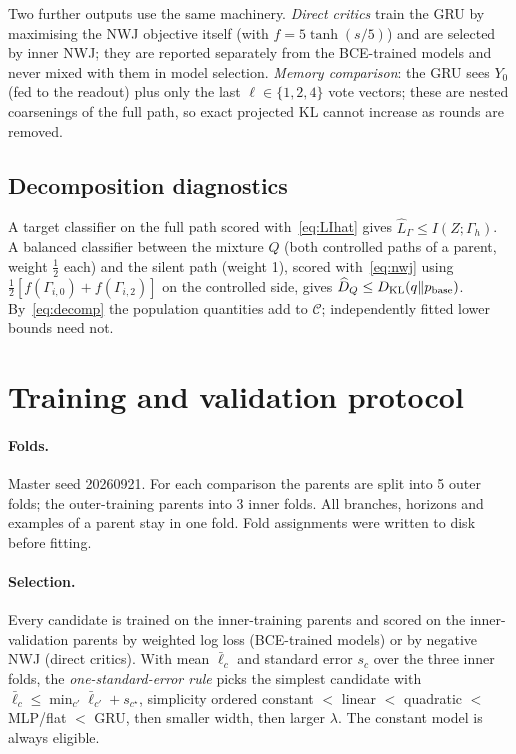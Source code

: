 \documentclass[10pt]{article}
\newcommand{\KL}{D_{\mathrm{KL}}}
\newcommand{\Cost}{\mathcal{C}}
\newcommand{\Lhat}{\widehat L}
\begin{document}
Two further outputs use the same machinery. \emph{Direct critics} train the GRU by maximising the NWJ objective itself (with $f=5\tanh(s/5)$) and are selected by inner NWJ; they are reported separately from the BCE-trained models and never mixed with them in model selection. \emph{Memory comparison}: the GRU sees $Y_0$ (fed to the readout) plus only the last $\ell\in\{1,2,4\}$ vote vectors; these are nested coarsenings of the full path, so exact projected KL cannot increase as rounds are removed.

\subsection{Decomposition diagnostics}
A target classifier on the full path scored with~\eqref{eq:LIhat} gives $\Lhat_\Gamma\le I(Z;\Gamma_h)$. A balanced classifier between the mixture $Q$ (both controlled paths of a parent, weight $\tfrac12$ each) and the silent path (weight 1), scored with~\eqref{eq:nwj} using $\tfrac12[f(\Gamma_{i,0})+f(\Gamma_{i,2})]$ on the controlled side, gives $\widehat D_Q\le\KL(q\Vert p_{\rm base})$. By~\eqref{eq:decomp} the population quantities add to $\Cost$; independently fitted lower bounds need not.

\section{Training and validation protocol}
\paragraph{Folds.} Master seed 20260921. For each comparison the parents are split into 5 outer folds; the outer-training parents into 3 inner folds. All branches, horizons and examples of a parent stay in one fold. Fold assignments were written to disk before fitting.
\paragraph{Selection.} Every candidate is trained on the inner-training parents and scored on the inner-validation parents by weighted log loss (BCE-trained models) or by negative NWJ (direct critics). With mean $\bar\ell_c$ and standard error $s_c$ over the three inner folds, the \emph{one-standard-error rule} picks the simplest candidate with $\bar\ell_c\le\min_{c'}\bar\ell_{c'}+s_{c^\star}$, simplicity ordered constant $<$ linear $<$ quadratic $<$ MLP/flat $<$ GRU, then smaller width, then larger $\lambda$. The constant model is always eligible.
\end{document}
